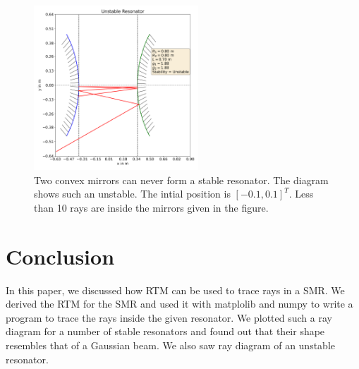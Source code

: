 \documentclass[12pt]{article}
\begin{document}
\begin{figure}
    \centering
    \includegraphics[width=0.55\textwidth]{images/unstable.png}
    \caption{Two convex mirrors can never form a stable resonator. The diagram shows such an unstable. The intial position is \([-0.1, 0.1]^T\). Less than 10 rays are inside the mirrors given in the figure.}
    \label{fig:unstable}
\end{figure}
\clearpage
\newpage
\section{Conclusion}
In this paper, we discussed how RTM can be used to trace rays in a SMR. We derived the RTM for the SMR and used it with {\color{cyan} matplolib} and {\color{cyan} numpy} to write a program to trace the rays inside the given resonator. We plotted such a ray diagram for a number of stable resonators and found out that their shape resembles that of a Gaussian beam. We also saw ray diagram of an unstable resonator.
\printbibliography
\end{document}
